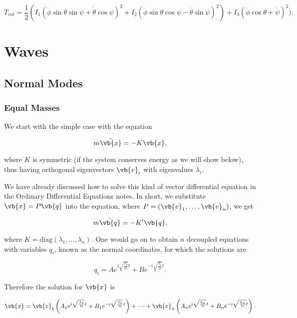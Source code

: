 \documentclass[a4paper,12pt]{report}
\begin{document}
\begin{equation}
	T_{rot} = \frac{1}{2} (I_1(\dot{\phi } \sin \theta \sin \psi + \dot{\theta } \cos \psi )^2 + I_2(\dot{\phi } \sin \theta \cos \psi -\dot{\theta } \sin \psi )^2) + I_3(\dot{\phi } \cos \theta + \dot{\psi } )^2).
\end{equation}

\chapter{Waves}

\section{Normal Modes}

\subsection{Equal Masses}

We start with the simple case with the equation

\begin{equation}
    m \ddot{\vb{x} } = -K\vb{x}, \label{normal} 
\end{equation}

where \(K\) is symmetric (if the system conserves energy as we will show below), thus having orthogonal eigenvectors \(\vb{v} _{i} \) with eigenvalues \(\lambda _{i} \).

We have already discussed how to solve this kind of vector differential equation in the Ordinary Differential Equations notes. In short, we substitute \(\vb{x} = P \vb{q} \) into the equation, where \(P = (\vb{v} _{1},\ldots ,\vb{v} _{n}   )\), we get

\begin{equation}
    m \ddot{\vb{q} } = -K'\vb{q},
\end{equation}

where \(K = \text{diag}(\lambda _{1}, \ldots , \lambda _{n})\). One would go on to obtain \(n\) decoupled equations with variables \(q_{i}\), known as the normal coordinates, for which the solutions are 

\begin{equation}
	q_{i} = Ae^{i\sqrt{\frac{\lambda _{i} }{m} } t} + Be^{-i\sqrt{\frac{\lambda _{i} }{m} } t}.  
\end{equation}

Therefore the solution for \(\vb{x} \) is

\begin{equation}
	\vb{x} = \vb{v} _{1}\left(A_1 e^{i\sqrt{\frac{\lambda _{1} }{m} } t} + B_1 e^{-i\sqrt{\frac{\lambda _{1} }{m} } t}\right) + \cdots + \vb{v} _{n} \left(A_{n} e^{i\sqrt{\frac{\lambda _{n} }{m} } t} + B_{n} e^{-i\sqrt{\frac{\lambda _{n} }{m} } t}\right).
\end{equation}
\end{document}
